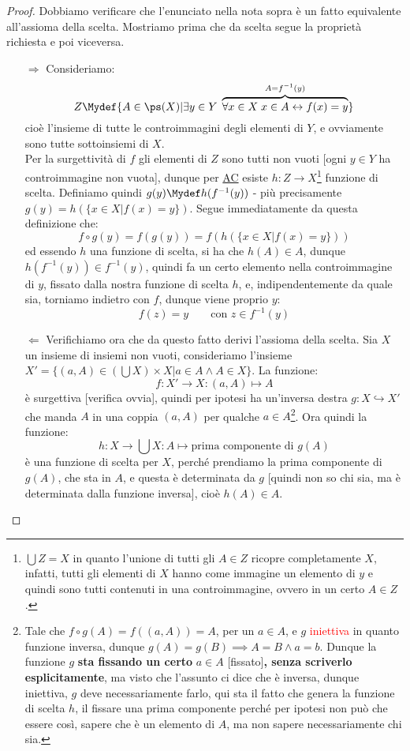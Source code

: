 \documentclass[11pt]{scrartcl}
\begin{document}
\begin{proof}
	Dobbiamo verificare che l'enunciato nella nota sopra è un fatto equivalente all'assioma della scelta. Mostriamo prima che da scelta segue la proprietà richiesta e poi viceversa.
	\begin{itemize}
		\item[$\boxed{\Longrightarrow}$] Consideriamo:
		\[ Z \Mydef \{A \in \ps(X) | \exists y \in Y \; \overbrace{\forall x \in X \; x \in A \leftrightarrow f(x) = y}^{A = f^{-1}(y)}\}
			\]
		cioè l'insieme di tutte le controimmagini degli elementi di $Y$, e ovviamente sono tutte sottoinsiemi di $X$.\\
		Per la surgettività di $f$ gli elementi di $Z$ sono tutti non vuoti [ogni $y \in Y$ ha controimmagine non vuota], dunque per \hyperref[ax9]{AC} esiste $h : Z \rightarrow X$\footnote{$\bigcup Z  = X$ in quanto l'unione di tutti gli $A \in Z$ ricopre completamente $X$, infatti, tutti gli elementi di $X$ hanno
		come immagine un elemento di $y$ e quindi sono tutti contenuti in una controimmagine, ovvero in un certo $A \in Z$.} funzione di scelta. Definiamo quindi $g(y) \Mydef h(f^{-1}(y))$ - più precisamente $g(y) = h(\{x \in X | f(x)  = y\})$.
		Segue immediatamente da questa definizione che:
		\[ f \circ g(y) = f(g(y)) = f(h(\{x \in X | f(x)  = y\}))
			\]
		ed essendo $h$ una funzione di scelta, si ha che $h(A) \in A$, dunque $h(f^{-1}(y)) \in f^{-1}(y)$, quindi fa un certo elemento nella controimmagine di $y$, fissato dalla nostra funzione di scelta $h$, e, indipendentemente da quale sia, torniamo indietro con $f$, dunque
		viene proprio $y$:
		\[ f(z) = y \qquad \text{con $z \in f^{-1}(y)$}
			\]
		\item[$\boxed{\Longleftarrow}$] Verifichiamo ora che da questo fatto derivi l'assioma della scelta. Sia $X$ un insieme di insiemi non vuoti, consideriamo l'insieme $X' = \{(a,A) \in \left(\bigcup X\right) \times X | a \in A \land A \in X\}$.
		La funzione:
		\[ f : X' \rightarrow X : (a,A) \mapsto A
			\]
		è surgettiva [verifica ovvia], quindi per ipotesi ha un'inversa destra $g : X \hookrightarrow X'$ che manda $A$ in una coppia $(a,A)$ per qualche $a \in A$\footnote{Tale che $f \circ g (A) = f((a,A)) = A$, per un $a \in A$, e $g$ \textcolor{red}{iniettiva} in quanto funzione inversa, dunque $g(A) = g(B) \implies A = B \land a = b$. Dunque 
		la funzione $g$ \textbf{sta fissando un certo} $a \in A$ [fissato]\textbf{, senza scriverlo esplicitamente}, ma visto che l'assunto ci dice che è inversa, dunque iniettiva, $g$ deve necessariamente farlo, qui sta il fatto che genera la funzione di scelta $h$, il fissare una prima componente perché per ipotesi non può che essere così, sapere che è un
		elemento di $A$, ma non sapere necessariamente chi sia.}. Ora quindi la funzione:
		\[ h : X \rightarrow \bigcup X : A \mapsto \text{prima componente di $g(A)$}
			\]
		è una funzione di scelta per $X$, perché prendiamo la prima componente di $g(A)$, che sta in $A$, e questa è determinata da $g$ [quindi non so chi sia, ma è determinata dalla funzione inversa], cioè $h(A) \in A$.
	\end{itemize}
\end{proof}
\end{document}
